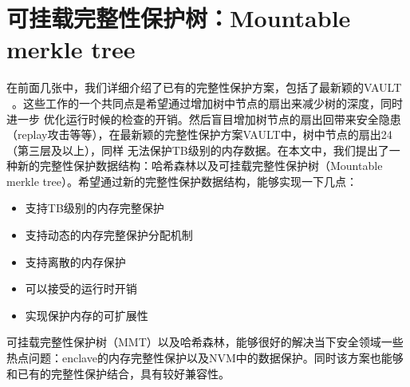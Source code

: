 \chapter{可挂载完整性保护树：Mountable merkle tree}

在前面几张中，我们详细介绍了已有的完整性保护方案，包括了最新颖的VAULT ~\cite{taassori2018vault}。这些工作的一个共同点是希望通过增加树中节点的扇出来减少树的深度，同时进一步
优化运行时候的检查的开销。然后盲目增加树节点的扇出回带来安全隐患（replay攻击等等），在最新颖的完整性保护方案VAULT中，树中节点的扇出24（第三层及以上），同样
无法保护TB级别的内存数据。在本文中，我们提出了一种新的完整性保护数据结构：哈希森林以及可挂载完整性保护树（Mountable merkle tree）。希望通过新的完整性保护数据结构，能够实现一下几点：
\begin{itemize}
    \item 支持TB级别的内存完整保护
    \item 支持动态的内存完整保护分配机制
    \item 支持离散的内存保护
    \item 可以接受的运行时开销
    \item 实现保护内存的可扩展性
\end{itemize}
可挂载完整性保护树（MMT）以及哈希森林，能够很好的解决当下安全领域一些热点问题：enclave的内存完整性保护以及NVM中的数据保护。同时该方案也能够和已有的完整性保护结合，具有较好兼容性。

